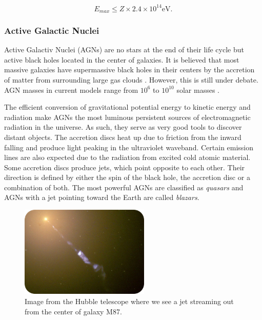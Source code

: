 \begin{equation}
E_{max} \leq Z \times 2.4 \times 10^{14} \textrm{eV}.
\end{equation}

\subsubsection{Active Galactic Nuclei}
\label{subsubsec:agn}
Active Galactiv Nuclei (AGNs) are no stars at the end of their life cycle but active black holes located in the center of galaxies. It is believed that most massive galaxies have supermassive black holes in their centers by the accretion of matter from surrounding large gas clouds \cite{Urry:1995mg,Antonucci:1993sg}. However, this is still under debate. AGN masses in current models range from $10^6$ to $10^{10}$ solar masses \cite{Kazanas:2012sk}.

The efficient conversion of gravitational potential energy to kinetic energy and radiation make AGNs the most luminous persistent sources of electromagnetic radiation in the universe. As such, they serve as very good tools to discover distant objects. The accretion discs heat up due to friction from the inward falling and produce light peaking in the ultraviolet waveband. Certain emission lines are also expected due to the radiation from excited cold atomic material. Some accretion discs produce jets, which point opposite to each other. Their direction is defined by either the spin of the black hole, the accretion disc or a combination of both.  The most powerful AGNs are classified as \textit{quasars} and AGNs with a jet pointing toward the Earth are called \textit{blazars}.

\begin{figure}
\centering
\includegraphics[width=0.55\textwidth]{chapter3/img/jet_crop_rounded.jpg}
\caption{
Image from the Hubble telescope where we see a jet streaming out from the center of galaxy M87.}
\end{figure}

